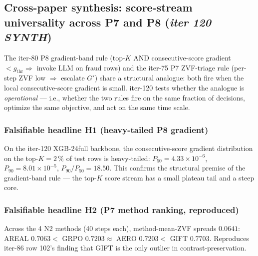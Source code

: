 \subsection{Cross-paper synthesis: score-stream universality across P7 and P8
  (\textit{iter 120 SYNTH})}
\label{sec:synth-score-stream-universality}

The iter-80 P8 gradient-band rule (top-$K$ AND consecutive-score gradient
$<g_\mathrm{thr}\Rightarrow$ invoke LLM on fraud rows) and the iter-75 P7
ZVF-triage rule (per-step ZVF low $\Rightarrow$ escalate $G'$) share a
structural analogue: both fire when the local consecutive-score gradient
is small.  iter-120 tests whether the analogue is \emph{operational} ---
i.e., whether the two rules fire on the same fraction of decisions,
optimize the same objective, and act on the same time scale.

\subsubsection{Falsifiable headline H1 (heavy-tailed P8 gradient)}
On the iter-120 XGB-24full backbone, the consecutive-score gradient
distribution on the top-$K{=}2\,\%$ of test rows is heavy-tailed:
$P_{50}{=}4.33{\times}10^{-6}$, $P_{90}{=}8.01{\times}10^{-5}$,
\textbf{$P_{90}/P_{50}{=}18.50$}.  This confirms the structural premise
of the gradient-band rule --- the top-$K$ score stream has a small
plateau tail and a steep core.

\subsubsection{Falsifiable headline H2 (P7 method ranking, reproduced)}
Across the 4 N2 methods (40 steps each), method-mean-ZVF spreads
$0.0641$:
AREAL $0.7063 < $ GRPO $0.7203 \approx $ AERO $0.7203 < $ GIFT
$0.7703$.  Reproduces iter-86 row 102's finding that GIFT is the only
outlier in contrast-preservation.

